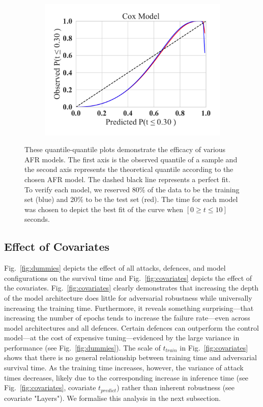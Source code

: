 \begin{figure}
\begin{subfigure}
	\end{subfigure}
	~
	\begin{subfigure}
		\centering
		\includegraphics[width=.30\textwidth,trim={20pt 20pt 20pt 20pt},clip]{plots/cox_qq.pdf}
	\end{subfigure}
	\caption{These quantile-quantile plots demonstrate the efficacy of various AFR models. The first axis is the observed quantile of a sample and the second axis represents the theoretical quantile according to the chosen AFR model. The dashed black line represents a perfect fit. To verify each model, we reserved 80\% of the data to be the training set (blue) and 20\% to be the test set (red). The time for each model was chosen to depict the best fit of the curve when $ [ 0 \geq t \leq 10 ] $ seconds. 
 }
	\label{fig:afr_models}
\end{figure}

\subsection{Effect of Covariates}
Fig.~\ref{fig:dummies} depicts the effect of all attacks, defences, and model configurations on the survival time and Fig.~\ref{fig:covariates} depicts the effect of the covariates. 
Fig.~\ref{fig:covariates} clearly demonstrates that increasing the depth of the model architecture does little for adversarial robustness while universally increasing the training time. 
Furthermore, it reveals something surprising---that increasing the number of epochs tends to increase the failure rate---even across model architectures and all defences. 
Certain defences can outperform the control model---at the cost of expensive tuning---evidenced by the large variance in performance (see Fig.~\ref{fig:dummies}). The scale of $t_{train}$  in Fig.~\ref{fig:covariates} shows that there is no general relationship between training time and adversarial survival time. 
As the training time increases, however, the variance of attack times decreases, likely due to the corresponding increase in inference time (see Fig.~\ref{fig:covariates}, covariate $t_{predict}$) rather than inherent robustness (see covariate "Layers").
We formalise this analysis  in the next subsection.

